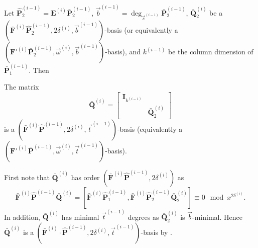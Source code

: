 Let $\hat{\mathbf{P}}_{2}^{\left(i-1\right)}=\mathbf{E}^{\left(i\right)}\bar{\mathbf{P}}_{2}^{\left(i-1\right)}$,
$\vec{b}^{\left(i-1\right)}=\deg_{\vec{s}^{\left(i-1\right)}}\bar{\mathbf{P}}_{2}^{\left(i-1\right)}$,
$\bar{\mathbf{Q}}_{2}^{\left(i\right)}$ be a $(\bar{\mathbf{F}}^{\left(i\right)}\hat{\mathbf{P}}_{2}^{\left(i-1\right)},2\delta^{\left(i\right)},\vec{b}^{\left(i-1\right)})$-basis
(or equivalently a $(\mathbf{F}'^{\left(i\right)}\bar{\mathbf{P}}_{2}^{\left(i-1\right)},\vec{\omega}^{\left(i\right)},\vec{b}^{\left(i-1\right)})$-basis),
and $k^{\left(i-1\right)}$ be the column dimension of $\bar{\mathbf{P}}_{1}^{\left(i-1\right)}$.
Then 
\begin{lem}
\label{lem:disregardComputedBasisElements} The matrix \[
\bar{\mathbf{Q}}^{\left(i\right)}=\left[\begin{array}{cc}
\mathbf{I}_{k^{\left(i-1\right)}}\\
 & \bar{\mathbf{Q}}_{2}^{\left(i\right)}\end{array}\right]\]
 is a $(\bar{\mathbf{F}}^{\left(i\right)}\hat{\mathbf{P}}^{\left(i-1\right)},2\delta^{\left(i\right)},\vec{t}^{\left(i-1\right)})$-basis
(equivalently a $(\mathbf{F}'^{\left(i\right)}\bar{\mathbf{P}}^{\left(i-1\right)},\vec{\omega}^{\left(i\right)},\vec{t}^{\left(i-1\right)})$-basis).\end{lem}
\begin{pf}
First note that $\bar{\mathbf{Q}}^{\left(i\right)}$ has order $(\bar{\mathbf{F}}^{\left(i\right)}\hat{\mathbf{P}}^{\left(i-1\right)},2\delta^{\left(i\right)})$
as \[
\bar{\mathbf{F}}^{\left(i\right)}\hat{\mathbf{P}}^{\left(i-1\right)}\bar{\mathbf{Q}}^{\left(i\right)}=[\bar{\mathbf{F}}^{\left(i\right)}\hat{\mathbf{P}}_{1}^{\left(i-1\right)},\bar{\mathbf{F}}^{\left(i\right)}\hat{\mathbf{P}}_{2}^{\left(i-1\right)}\bar{\mathbf{Q}}_{2}^{\left(i\right)}]\equiv0\mod x^{2\delta^{\left(i\right)}}.\]
 In addition, $\bar{\mathbf{Q}}^{\left(i\right)}$ has minimal $\vec{t}^{\left(i-1\right)}$
degrees as $\bar{\mathbf{Q}}_{2}^{\left(i\right)}$ is $\vec{b}$-minimal.
Hence $\bar{\mathbf{Q}}^{\left(i\right)}$ is a $(\bar{\mathbf{F}}^{\left(i\right)}\cdot\hat{\mathbf{P}}^{\left(i-1\right)},2\delta^{\left(i\right)},\vec{t}^{\left(i-1\right)})$-basis
by . 
\end{pf}
%
\begin{comment}
Alternatively, one can also argue that since $\hat{\mathbf{P}}_{1}^{\left(i-1\right)}$
already has order $(\bar{\mathbf{F}}^{\left(i\right)},2\delta^{\left(i\right)})$,
it cannot contribute in any way to and cannot be affected in any way
by the computations of a $(\bar{\mathbf{F}}^{\left(i\right)}\hat{\mathbf{P}}^{\left(i-1\right)},2\delta^{\left(i\right)},\vec{b}^{\left(i-1\right)})$-basis,
hence it is sufficient to just use $\bar{\mathbf{F}}^{\left(i\right)}\hat{\mathbf{P}}_{2}^{\left(i-1\right)}$
to compute a $(\bar{\mathbf{F}}^{\left(i\right)}\cdot\hat{\mathbf{P}}_{2}^{\left(i-1\right)},2\delta^{\left(i\right)},\vec{b}^{\left(i-1\right)})$-basis. 
\end{comment}
{}

